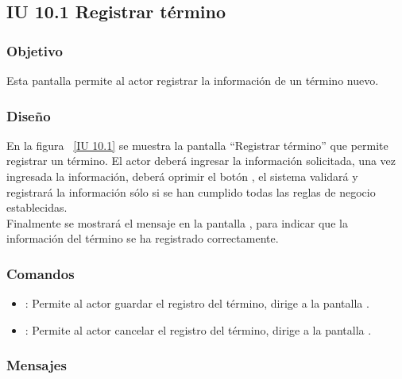 \subsection{IU 10.1 Registrar término}

\subsubsection{Objetivo}
	
	Esta pantalla permite al actor registrar la información de un término nuevo.

\subsubsection{Diseño}

    En la figura ~\ref{IU 10.1} se muestra la pantalla ``Registrar término'' que permite registrar un término. El actor deberá ingresar la información solicitada, 
    una vez ingresada la información, deberá oprimir el botón 
    , el sistema validará y registrará la información sólo si se han cumplido todas las reglas de negocio establecidas.  \\
    
    Finalmente se mostrará el mensaje  en la pantalla , para indicar que la información del término
    se ha registrado correctamente.  \\      



\subsubsection{Comandos}
\begin{itemize}
	\item {}: Permite al actor guardar el registro del término, dirige a la pantalla .
	\item {}: Permite al actor cancelar el registro del término, dirige a la pantalla .
\end{itemize}

\subsubsection{Mensajes}


